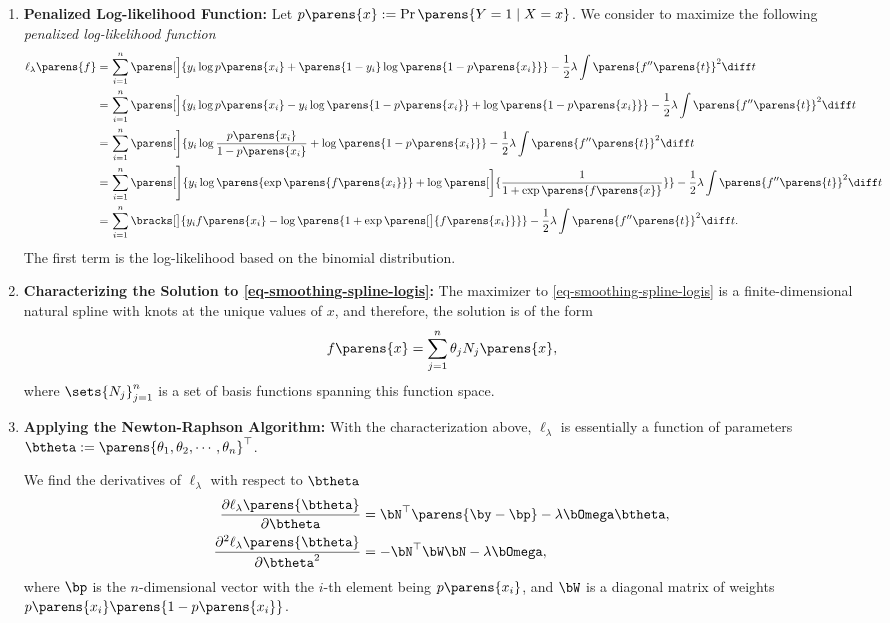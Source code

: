 \documentclass[12pt]{article}
\begin{document}
\begin{enumerate}[label=\textbf{\arabic*.}]
	\item \textbf{Penalized Log-likelihood Function:} Let $p \parens{x} := \Pr \parens{Y = 1 \mid X = x}$. We consider to maximize the following \emph{penalized log-likelihood function} 
	\begin{align}
		\ell_{\lambda} \parens{f} = & \, \sum_{i=1}^n \parens[\Big]{y_i \log p \parens{x_i} + \parens{1 - y_i} \log \parens{1- p \parens{x_i} } } - \frac{1}{2} \lambda \int \parens{f''\parens{t}}^2 \diff t \nonumber \\
		= & \, \sum_{i=1}^n \parens[\Big]{y_i \log p \parens{x_i} - y_i \log \parens{1 - p \parens{x_i} } + \log \parens{1- p \parens{x_i} } } - \frac{1}{2} \lambda \int \parens{f''\parens{t}}^2 \diff t \nonumber \\
		= & \, \sum_{i=1}^n \parens[\bigg]{y_i \log \frac{p \parens{x_i} }{1- p \parens{x_i}} + \log \parens{1 - p \parens{x_i} } } - \frac{1}{2} \lambda \int \parens{f''\parens{t}}^2 \diff t \nonumber \\
		= & \, \sum_{i=1}^n \parens[\Bigg]{y_i \log \parens{\exp \parens{f \parens{x_i} }} + \log \parens[\bigg]{\frac{1}{1 + \exp \parens{f \parens{x} }}}} - \frac{1}{2} \lambda \int \parens{f''\parens{t}}^2 \diff t \nonumber \\
		= & \, \sum_{i=1}^n \bracks[\big]{y_i f \parens{x_i} - \log \parens{1 + \exp \parens[\big]{f \parens{x_i} }}} - \frac{1}{2} \lambda \int \parens{f''\parens{t}}^2 \diff t. \label{eq-smoothing-spline-logis}
	\end{align}
	The first term is the log-likelihood based on the binomial distribution. 
	
	\item \textbf{Characterizing the Solution to \eqref{eq-smoothing-spline-logis}:} The maximizer to \eqref{eq-smoothing-spline-logis} is a finite-dimensional natural spline with knots at the unique values of $x$, and therefore, the solution is of the form 
	\begin{align*}
		f \parens{x} = \sum_{j=1}^n \theta_j N_j \parens{x},  
	\end{align*}
	where $\sets{N_j}_{j=1}^n$ is a set of basis functions spanning this function space. 
	
	\item \textbf{Applying the Newton-Raphson Algorithm:} With the characterization above, $\ell_{\lambda}$ is essentially a function of parameters $\btheta := \parens{\theta_1, \theta_2, \cdots, \theta_n}^\top$. 
	
	We find the derivatives of $\ell_{\lambda}$ with respect to $\btheta$ 
	\begin{align*}
		\frac{\partial \ell_{\lambda} \parens{\btheta}}{\partial \btheta} & = \bN^\top \parens{\by - \bp} - \lambda \bOmega \btheta, \\ 
		\frac{\partial^2 \ell_{\lambda} \parens{\btheta}}{\partial \btheta^2} & = - \bN^\top \bW \bN - \lambda \bOmega, 
	\end{align*}
	where $\bp$ is the $n$-dimensional vector with the $i$-th element being $p \parens{x_i}$, and $\bW$ is a diagonal matrix of weights $p \parens{x_i} \parens{ 1 - p \parens{x_i}}$. 
	

\end{enumerate}
\end{document}
